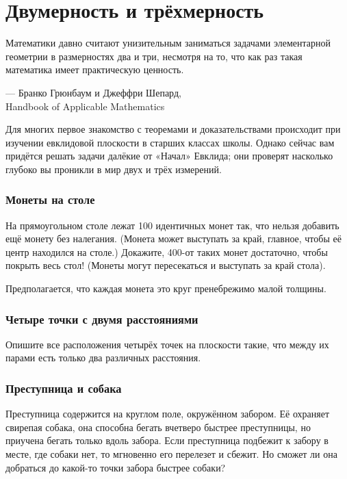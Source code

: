 \chapter{Двумерность и трёхмерность}

\setlength{\epigraphwidth}{.83\textwidth}
\epigraph{Математики давно считают унизительным заниматься задачами элементарной геометрии в размерностях два и три, несмотря на то, что как раз такая математика имеет практическую ценность.}{--- Бранко Грюнбаум и Джеффри Шепард,\\ Handbook of Applicable Mathematics}

Для многих первое знакомство с теоремами и доказательствами
происходит при изучении евклидовой плоскости
в старших классах школы.
Однако сейчас вам придётся решать задачи далёкие от «Начал» Евклида;
они проверят насколько глубоко вы проникли в мир двух и трёх измерений.

\subsection*{Монеты на столе}

На прямоугольном столе лежат 100 идентичных монет так, что нельзя добавить ещё монету без налегания.
(Монета может выступать за край, главное, чтобы её центр находился на столе.)
Докажите, 400-от таких монет достаточно, чтобы покрыть весь стол!
(Монеты могут пересекаться и выступать за край стола).

Предполагается, что каждая монета это круг пренебрежимо малой толщины.

\subsection*{Четыре точки с двумя расстояниями}

Опишите все расположения четырёх точек на плоскости такие, что между их парами есть только два различных расстояния.

\subsection*{Преступница и собака}

Преступница содержится на круглом  поле, окружённом забором.
Её охраняет свирепая собака, она способна бегать вчетверо быстрее преступницы, но приучена бегать только вдоль забора.
Если преступница подбежит к забору в месте, где собаки нет, то мгновенно его перелезет и сбежит.
Но сможет ли она добраться до какой-то точки забора быстрее собаки?

